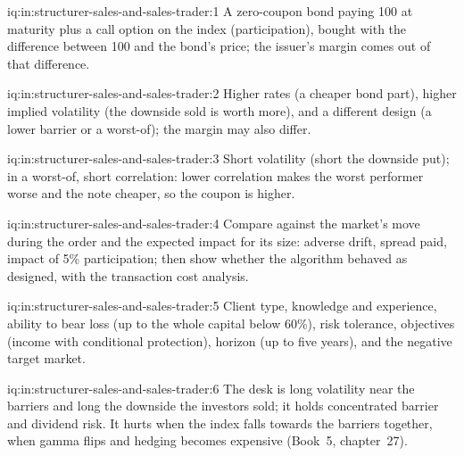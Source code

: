\begin{solution}{iq:in:structurer-sales-and-sales-trader:1}
A zero-coupon bond paying 100 at maturity plus a call option on the index (participation), bought with the difference
between 100 and the bond's price; the issuer's margin comes out of that difference.
\end{solution}

\begin{solution}{iq:in:structurer-sales-and-sales-trader:2}
Higher rates (a cheaper bond part), higher implied volatility (the downside sold is worth more), and a different design
(a lower barrier or a worst-of); the margin may also differ.
\end{solution}

\begin{solution}{iq:in:structurer-sales-and-sales-trader:3}
Short volatility (short the downside put); in a worst-of, short correlation: lower correlation makes the worst performer
worse and the note cheaper, so the coupon is higher.
\end{solution}

\begin{solution}{iq:in:structurer-sales-and-sales-trader:4}
Compare against the market's move during the order and the expected impact for its size: adverse drift, spread paid,
impact of 5\% participation; then show whether the algorithm behaved as designed, with the transaction cost analysis.
\end{solution}

\begin{solution}{iq:in:structurer-sales-and-sales-trader:5}
Client type, knowledge and experience, ability to bear loss (up to the whole capital below 60\%), risk tolerance,
objectives (income with conditional protection), horizon (up to five years), and the negative target market.
\end{solution}

\begin{solution}{iq:in:structurer-sales-and-sales-trader:6}
The desk is long volatility near the barriers and long the downside the investors sold; it holds concentrated barrier
and dividend risk. It hurts when the index falls towards the barriers together, when gamma flips and hedging becomes
expensive (Book~5, chapter~27).
\end{solution}
